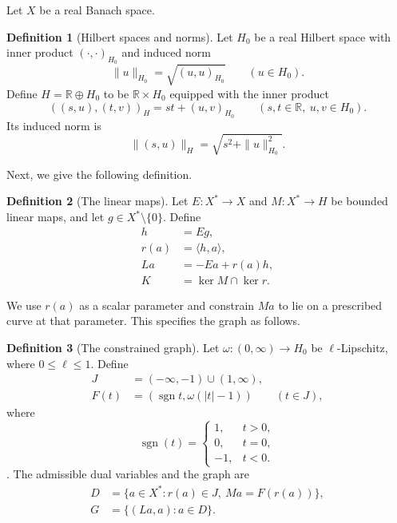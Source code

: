 \documentclass[11pt]{article}
\newcommand{\R}{\mathbb R}
\newcommand{\sgn}{\operatorname{sgn}}
\newcommand{\pair}[2]{\langle #1,#2\rangle}
\theoremstyle{definition}
\newtheorem{definition}{Definition}
\theoremstyle{remark}
\begin{document}
Let $X$ be a real Banach space.
\begin{definition}[Hilbert spaces and norms]
\label{def:hilbert-spaces-norms}
Let $H_0$ be a real Hilbert space with inner product $(\cdot,\cdot)_{H_0}$ and induced norm
\[
\|u\|_{H_0}=\sqrt{(u,u)_{H_0}}\qquad(u\in H_0).
\]
Define $H=\R\oplus H_0$ to be $\R\times H_0$ equipped with the inner product
\[
((s,u),(t,v))_H=st+(u,v)_{H_0}
\qquad(s,t\in\R,\ u,v\in H_0).
\]
Its induced norm is
\[
\|(s,u)\|_H=\sqrt{s^2+\|u\|_{H_0}^2}.
\]
\end{definition}
Next, we give the following definition.

\begin{definition}[The linear maps]
\label{def:construction-maps}
Let $E:X^*\to X$ and $M:X^*\to H$ be bounded linear maps, and let $g\in X^*\setminus\{0\}$. Define
\[
\begin{aligned}
h&=Eg,\\
r(a)&=\pair{h}{a},\\
La&=-Ea+r(a)h,\\
K&=\ker M\cap\ker r.
\end{aligned}
\]
\end{definition}

We use $r(a)$ as a scalar parameter and constrain $Ma$ to lie on a prescribed curve at that parameter. This specifies the graph as follows.

\begin{definition}[The constrained graph]
\label{def:construction-graph}
Let $\omega:(0,\infty)\to H_0$ be $\ell$-Lipschitz, where $0\le\ell\le1$. Define
\[
\begin{aligned}
J&=(-\infty,-1)\cup(1,\infty),\\
F(t)&=(\sgn t,\omega(|t|-1))\qquad(t\in J), 
\end{aligned}
\]
where \[
\operatorname{sgn}(t)=
\begin{cases}
1, & t>0,\\
0, & t=0,\\
-1, & t<0.
\end{cases}
\]. 
The admissible dual variables and the graph are
\begin{equation}
\begin{aligned}
D&=\{a\in X^*:r(a)\in J,\ Ma=F(r(a))\},\\
G&=\{(La,a):a\in D\}.
\end{aligned}
\label{eq:abs-full-graph}
\end{equation}
\end{definition}
\end{document}
